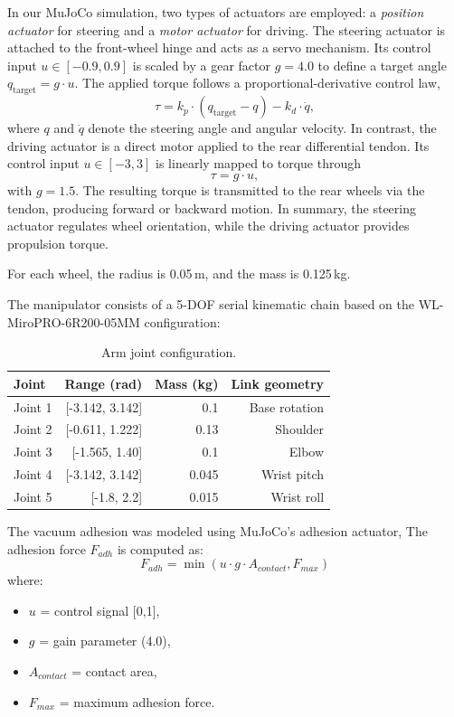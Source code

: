 \documentclass[english, 12pt, a4paper, elec, utf8, a-2b, online]{aaltothesis}
\begin{document}
In our MuJoCo simulation, two types of actuators are employed: a \textit{position actuator} for steering and a \textit{motor actuator} for driving. The steering actuator is attached to the front-wheel hinge and acts as a servo mechanism. Its control input $u \in [-0.9, 0.9]$ is scaled by a gear factor $g = 4.0$ to define a target angle $q_{\text{target}} = g \cdot u$. The applied torque follows a proportional-derivative control law,
\begin{equation}
\tau = k_p \cdot (q_{\text{target}} - q) - k_d \cdot \dot{q},
\end{equation}
where $q$ and $\dot{q}$ denote the steering angle and angular velocity. In contrast, the driving actuator is a direct motor applied to the rear differential tendon. Its control input $u \in [-3, 3]$ is linearly mapped to torque through
\begin{equation}
\tau = g \cdot u,
\end{equation}
with $g = 1.5$. The resulting torque is transmitted to the rear wheels via the tendon, producing forward or backward motion. In summary, the steering actuator regulates wheel orientation, while the driving actuator provides propulsion torque.


For each wheel, the radius is 0.05\,m, and the mass is 0.125\,kg.

The manipulator consists of a 5-DOF serial kinematic chain based on the WL-MiroPRO-6R200-05MM configuration:
\begin{table}[H]
\centering
\begin{tabular}{l|r|r|r}
Joint & Range (rad) & Mass (kg) & Link geometry \\\hline
Joint 1 & [-3.142, 3.142] &  0.1 &  Base rotation \\
Joint 2 & [-0.611, 1.222] &  0.13 &  Shoulder \\
Joint 3 & [-1.565, 1.40] &  0.1 &  Elbow \\
Joint 4 & [-3.142, 3.142] &  0.045 &  Wrist pitch \\
Joint 5 & [-1.8, 2.2] &  0.015 &  Wrist roll \\
\end{tabular}
\caption{\label{tab:manipulator_joint_specs}Arm joint configuration.}
\end{table}


The vacuum adhesion was modeled using MuJoCo's adhesion actuator, The adhesion force $F_{adh}$ is computed as: 
\begin{equation}
F_{adh} = \min(u \cdot g \cdot A_{contact}, F_{max})
\end{equation}
where:
\begin{itemize}
\item $u$ = control signal [0,1],
\item $g$ = gain parameter (4.0),
\item $A_{contact}$ = contact area,
\item $F_{max}$ = maximum adhesion force.
\end{itemize}
\end{document}
